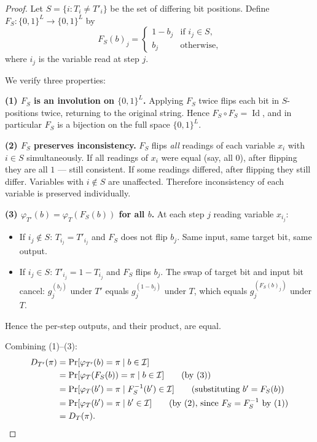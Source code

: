 \documentclass[version=final]{iacrcc}
\DeclareMathOperator{\Id}{Id}
\begin{document}
\begin{proof}
Let $S = \{i : T_i \neq T'_i\}$ be the set of differing bit positions.
Define $F_S : \{0,1\}^L \to \{0,1\}^L$ by
\[
F_S(b)_j =
\begin{cases}
1 - b_j & \text{if } i_j \in S, \\
b_j & \text{otherwise},
\end{cases}
\]
where $i_j$ is the variable read at step $j$.

We verify three properties:

\textbf{(1) $F_S$ is an involution on $\{0,1\}^L$.}
Applying $F_S$ twice flips each bit in $S$-positions twice, returning to
the original string. Hence $F_S \circ F_S = \Id$, and in particular $F_S$
is a bijection on the full space $\{0,1\}^L$.

\textbf{(2) $F_S$ preserves inconsistency.}
$F_S$ flips \emph{all} readings of each variable $x_i$ with $i \in S$
simultaneously. If all readings of $x_i$ were equal (say, all $0$), after
flipping they are all $1$ --- still consistent. If some readings differed,
after flipping they still differ. Variables with $i \notin S$ are unaffected.
Therefore inconsistency of each variable is preserved individually.

\textbf{(3) $\varphi_{T'}(b) = \varphi_T(F_S(b))$ for all $b$.}
At each step $j$ reading variable $x_{i_j}$:
\begin{itemize}[nosep]
\item If $i_j \notin S$: $T_{i_j} = T'_{i_j}$ and $F_S$ does not flip $b_j$.
  Same input, same target bit, same output.
\item If $i_j \in S$: $T'_{i_j} = 1 - T_{i_j}$ and $F_S$ flips $b_j$.
  The swap of target bit and input bit cancel:
  $g_j^{(b_j)}$ under $T'$ equals $g_j^{(1-b_j)}$ under $T$, which equals
  $g_j^{(F_S(b)_j)}$ under $T$.
\end{itemize}
Hence the per-step outputs, and their product, are equal.

Combining (1)--(3):
\begin{align*}
D_{T'}(\pi) &= \Pr[\varphi_{T'}(b) = \pi \mid b \in \mathcal{I}] \\
&= \Pr[\varphi_T(F_S(b)) = \pi \mid b \in \mathcal{I}] \tag{by (3)} \\
&= \Pr[\varphi_T(b') = \pi \mid F_S^{-1}(b') \in \mathcal{I}]
\tag{substituting $b' = F_S(b)$} \\
&= \Pr[\varphi_T(b') = \pi \mid b' \in \mathcal{I}]
\tag{by (2), since $F_S = F_S^{-1}$ by (1)} \\
&= D_T(\pi). \qedhere
\end{align*}
\end{proof}
\end{document}
